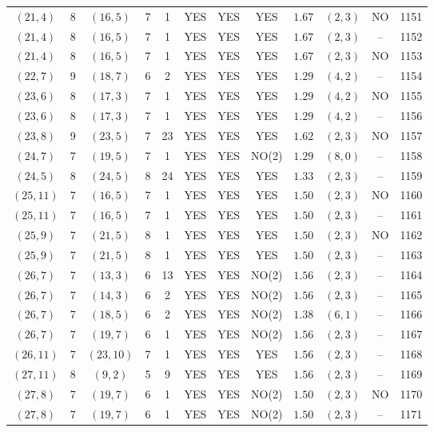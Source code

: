 \begin{longtable}{|c|c|c|c|c|c|c|c|c|c|c|c|}
$(21,4)$ & 8 & $(16,5)$ & 7 & 1 & YES & YES & YES & $1.67$ & $(2,3)$ & NO & 1151\\
$(21,4)$ & 8 & $(16,5)$ & 7 & 1 & YES & YES & YES & $1.67$ & $(2,3)$ & -- & 1152\\
$(21,4)$ & 8 & $(16,5)$ & 7 & 1 & YES & YES & YES & $1.67$ & $(2,3)$ & NO & 1153\\
$(22,7)$ & 9 & $(18,7)$ & 6 & 2 & YES & YES & YES & $1.29$ & $(4,2)$ & -- & 1154\\
$(23,6)$ & 8 & $(17,3)$ & 7 & 1 & YES & YES & YES & $1.29$ & $(4,2)$ & NO & 1155\\
$(23,6)$ & 8 & $(17,3)$ & 7 & 1 & YES & YES & YES & $1.29$ & $(4,2)$ & -- & 1156\\
$(23,8)$ & 9 & $(23,5)$ & 7 & 23 & YES & YES & YES & $1.62$ & $(2,3)$ & NO & 1157\\
$(24,7)$ & 7 & $(19,5)$ & 7 & 1 & YES & YES & NO(2) & $1.29$ & $(8,0)$ & -- & 1158\\
$(24,5)$ & 8 & $(24,5)$ & 8 & 24 & YES & YES & YES & $1.33$ & $(2,3)$ & -- & 1159\\
$(25,11)$ & 7 & $(16,5)$ & 7 & 1 & YES & YES & YES & $1.50$ & $(2,3)$ & NO & 1160\\
$(25,11)$ & 7 & $(16,5)$ & 7 & 1 & YES & YES & YES & $1.50$ & $(2,3)$ & -- & 1161\\
$(25,9)$ & 7 & $(21,5)$ & 8 & 1 & YES & YES & YES & $1.50$ & $(2,3)$ & NO & 1162\\
$(25,9)$ & 7 & $(21,5)$ & 8 & 1 & YES & YES & YES & $1.50$ & $(2,3)$ & -- & 1163\\
$(26,7)$ & 7 & $(13,3)$ & 6 & 13 & YES & YES & NO(2) & $1.56$ & $(2,3)$ & -- & 1164\\
$(26,7)$ & 7 & $(14,3)$ & 6 & 2 & YES & YES & NO(2) & $1.56$ & $(2,3)$ & -- & 1165\\
$(26,7)$ & 7 & $(18,5)$ & 6 & 2 & YES & YES & NO(2) & $1.38$ & $(6,1)$ & -- & 1166\\
$(26,7)$ & 7 & $(19,7)$ & 6 & 1 & YES & YES & NO(2) & $1.56$ & $(2,3)$ & -- & 1167\\
$(26,11)$ & 7 & $(23,10)$ & 7 & 1 & YES & YES & YES & $1.56$ & $(2,3)$ & -- & 1168\\
$(27,11)$ & 8 & $(9,2)$ & 5 & 9 & YES & YES & YES & $1.56$ & $(2,3)$ & -- & 1169\\
$(27,8)$ & 7 & $(19,7)$ & 6 & 1 & YES & YES & NO(2) & $1.50$ & $(2,3)$ & NO & 1170\\
$(27,8)$ & 7 & $(19,7)$ & 6 & 1 & YES & YES & NO(2) & $1.50$ & $(2,3)$ & -- & 1171\\

\end{longtable}
